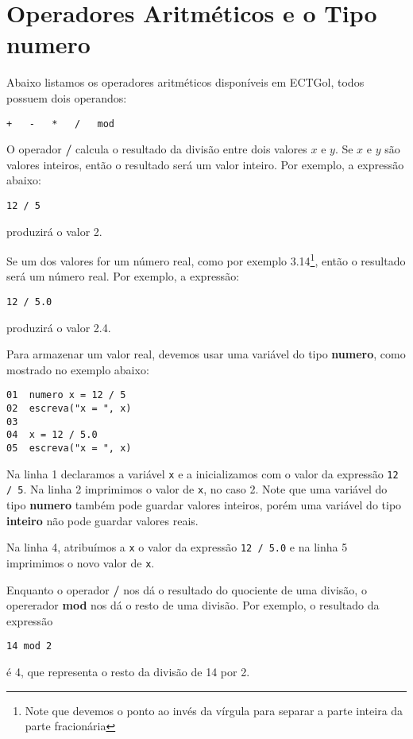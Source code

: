 \documentclass{report}
\newcommand{\Egol}{ECTGol\;}
\begin{document}
\section{Operadores Aritméticos e o Tipo \textbf{numero}}


Abaixo listamos os operadores aritméticos disponíveis em \Egol,
todos possuem dois operandos:
\begin{verbatim}
+   -   *   /   mod
\end{verbatim}


O operador \textbf{/} calcula o resultado da divisão entre dois valores
$x$ e $y$. Se $x$ e $y$ são valores inteiros, então o resultado será um
valor inteiro. Por exemplo, a expressão abaixo:
\begin{verbatim}
12 / 5
\end{verbatim}
produzirá o valor 2.

Se um dos valores for um número real, como por exemplo 3.14\footnote{Note que devemos
o ponto ao invés da vírgula para separar a parte inteira da parte fracionária}, então
o resultado será um número real. Por exemplo, a expressão:
\begin{verbatim}
12 / 5.0
\end{verbatim}
produzirá o valor 2.4.

Para armazenar um valor real, devemos usar uma variável do tipo
\textbf{numero}, como mostrado no exemplo abaixo:
\begin{verbatim}
01  numero x = 12 / 5
02  escreva("x = ", x)
03
04  x = 12 / 5.0
05  escreva("x = ", x)
\end{verbatim}
%
Na linha 1 declaramos a variável \texttt{x} e a inicializamos
com o valor da expressão \texttt{12 / 5}. Na linha 2 imprimimos
o valor de \texttt{x}, no caso 2. Note que uma variável do tipo
\textbf{numero} também pode guardar valores inteiros, porém uma
variável do tipo \textbf{inteiro} não pode guardar valores reais.

Na linha 4, atribuímos a \texttt{x} o valor da expressão \texttt{12 / 5.0}
e na linha 5 imprimimos o novo valor de \texttt{x}.


Enquanto o operador \textbf{/} nos dá o resultado do quociente
de uma divisão, o opererador \textbf{mod} nos dá o resto de uma
divisão. Por exemplo, o resultado da expressão
\begin{verbatim}
14 mod 2
\end{verbatim}
é 4, que representa o resto da divisão de 14 por 2.
\end{document}

